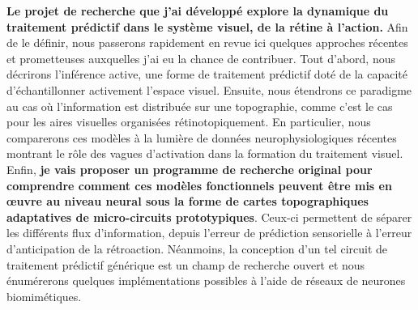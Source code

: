 \documentclass[11pt,french,a4paper,oneside]{article}%
\begin{document}
\textbf{Le projet de recherche que j'ai développé
explore la dynamique du traitement prédictif dans le système visuel,
de la rétine à l'action.}
Afin de le définir, nous passerons rapidement en revue ici quelques approches récentes et
prometteuses auxquelles j'ai eu la chance de contribuer. Tout d'abord, nous décrirons l'inférence active, une forme
de traitement prédictif doté de la capacité d'échantillonner activement
l'espace visuel. Ensuite, nous étendrons ce paradigme au cas où
l'information est distribuée sur une topographie, comme c'est le cas
pour les aires visuelles organisées rétinotopiquement. En particulier,
nous comparerons ces modèles à la lumière de données neurophysiologiques
récentes montrant le rôle des vagues d'activation dans la formation du
traitement visuel. Enfin, \textbf{je vais proposer un programme de recherche original
pour comprendre comment ces modèles fonctionnels peuvent être mis en
œuvre au niveau neural sous la forme de cartes topographiques adaptatives de micro-circuits
prototypiques}. Ceux-ci permettent de séparer les différents flux
d'information, depuis l'erreur de prédiction sensorielle à l'erreur d'anticipation de la rétroaction.
Néanmoins, la conception d'un tel
circuit de traitement prédictif générique est un champ de recherche ouvert et nous énumérerons quelques implémentations possibles à l'aide
de réseaux de neurones biomimétiques.
\end{document}
